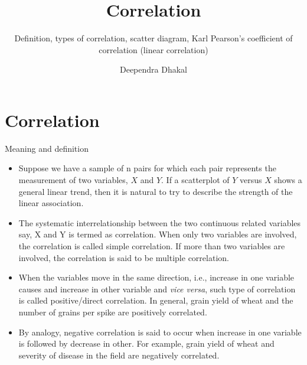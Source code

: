 \documentclass[
  ignorenonframetext,
  aspectratio=169]{beamer}
\title{Correlation}
\subtitle{Definition, types of correlation, scatter diagram, Karl
Pearson's coefficient of correlation (linear correlation)}
\author{Deependra Dhakal}
\date{}
\institute{Assistant Professor \and Agriculture and Forestry
University \and \url{https://rookie.rbind.io}}
\providecommand{\tightlist}{%
  \setlength{\itemsep}{0pt}\setlength{\parskip}{0pt}}
\begin{document}
\frame{\titlepage}

\begin{frame}[allowframebreaks]
  \tableofcontents[hideallsubsections]
\end{frame}
\hypertarget{correlation}{%
\section{Correlation}\label{correlation}}

\begin{frame}{Meaning and definition}
\protect\hypertarget{meaning-and-definition}{}
\begin{itemize}
\tightlist
\item
  Suppose we have a sample of n pairs for which each pair represents the
  measurement of two variables, \(X\) and \(Y\). If a scatterplot of
  \(Y\) versus \(X\) shows a general linear trend, then it is natural to
  try to describe the strength of the linear association.
\item
  The systematic interrelationship between the two continuous related
  variables say, X and Y is termed as correlation. When only two
  variables are involved, the correlation is called simple correlation.
  If more than two variables are involved, the correlation is said to be
  multiple correlation.
\item
  When the variables move in the same direction, i.e., increase in one
  variable causes and increase in other variable and \emph{vice versa},
  such type of correlation is called positive/direct correlation. In
  general, grain yield of wheat and the number of grains per spike are
  positively correlated.
\item
  By analogy, negative correlation is said to occur when increase in one
  variable is followed by decrease in other. For example, grain yield of
  wheat and severity of disease in the field are negatively correlated.
\end{itemize}
\end{frame}
\end{document}

